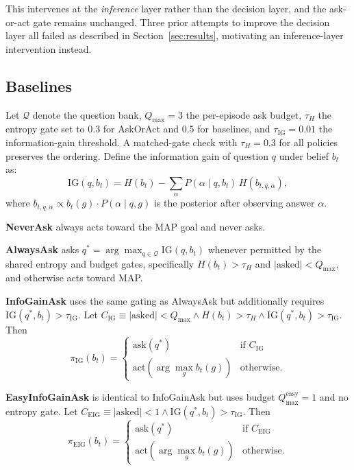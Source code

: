 \documentclass[10pt,twocolumn]{article}
\begin{document}
This intervenes at the \emph{inference} layer rather than the decision layer, and the ask-or-act gate remains unchanged.
Three prior attempts to improve the decision layer all failed as described in Section~\ref{sec:results}, motivating an inference-layer intervention instead.

\subsection{Baselines}

Let $\mathcal{Q}$ denote the question bank, $Q_{\max}{=}3$ the per-episode ask budget, $\tau_H$ the entropy gate set to $0.3$ for AskOrAct and $0.5$ for baselines, and $\tau_{\mathrm{IG}}{=}0.01$ the information-gain threshold. A matched-gate check with $\tau_H{=}0.3$ for all policies preserves the ordering.
Define the information gain of question $q$ under belief $b_t$ as:
\[
  \mathrm{IG}(q, b_t) = H(b_t) - \sum_{\alpha} P(\alpha \mid q, b_t)\, H(b_{t,q,\alpha}),
\]
where $b_{t,q,\alpha} \propto b_t(g)\cdot P(\alpha \mid q, g)$ is the posterior after observing answer $\alpha$.

\textbf{NeverAsk} always acts toward the MAP goal and never asks.

\textbf{AlwaysAsk} asks $q^*{=}\arg\max_{q \in \mathcal{Q}} \mathrm{IG}(q,b_t)$ whenever permitted by the shared entropy and budget gates, specifically $H(b_t)>\tau_H$ and $|\text{asked}|<Q_{\max}$, and otherwise acts toward MAP.

\textbf{InfoGainAsk} uses the same gating as AlwaysAsk but additionally requires $\mathrm{IG}(q^*,b_t)>\tau_{\mathrm{IG}}$.
Let $C_{\mathrm{IG}} \equiv |\text{asked}|<Q_{\max} \wedge H(b_t)>\tau_H \wedge \mathrm{IG}(q^*,b_t)>\tau_{\mathrm{IG}}$. Then
\[
  \pi_{\mathrm{IG}}(b_t) =
  \begin{cases}
    \mathrm{ask}(q^*) & \text{if } C_{\mathrm{IG}} \\
    \mathrm{act}(\arg\max_g b_t(g)) & \text{otherwise.}
  \end{cases}
\]

\textbf{EasyInfoGainAsk} is identical to InfoGainAsk but uses budget $Q_{\max}^{\mathrm{easy}}{=}1$ and no entropy gate.
Let $C_{\mathrm{EIG}} \equiv |\text{asked}|<1 \wedge \mathrm{IG}(q^*,b_t)>\tau_{\mathrm{IG}}$. Then
\[
  \pi_{\mathrm{EIG}}(b_t) =
  \begin{cases}
    \mathrm{ask}(q^*) & \text{if } C_{\mathrm{EIG}} \\
    \mathrm{act}(\arg\max_g b_t(g)) & \text{otherwise.}
  \end{cases}
\]
\end{document}
